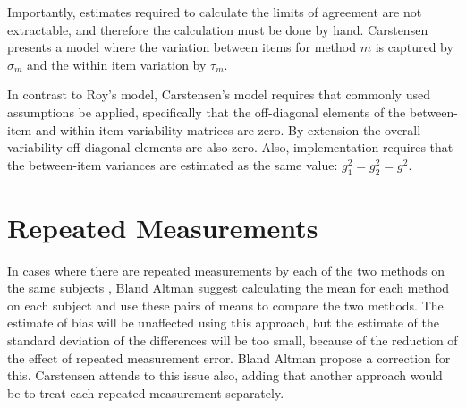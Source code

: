 \documentclass[12pt, a4paper]{report}
\theoremstyle{plain}
\theoremstyle{definition}
\theoremstyle{remark}
\begin{document}
Importantly, estimates required to calculate the limits of agreement are not extractable, and therefore the calculation must
be done by hand.
Carstensen presents a model where the variation between items for
method $m$ is captured by $\sigma_m$ and the within item variation
by $\tau_m$.



In contrast to Roy's model, Carstensen's model requires that commonly used assumptions be applied, specifically that the off-diagonal elements of the between-item and within-item variability matrices are zero. By
extension the overall variability off-diagonal elements are also zero. Also, implementation requires that the between-item variances are estimated as the same value: $g^2_1 = g^2_2 = g^2$.












\section{Repeated Measurements}

In cases where there are repeated measurements by each of the two
methods on the same subjects , Bland Altman suggest calculating
the mean for each method on each subject and use these pairs of
means to compare the two methods.
The estimate of bias will be unaffected using this approach, but
the estimate of the standard deviation of the differences will be
too small, because of the reduction of the effect of repeated
measurement error. Bland Altman propose a correction for this.
Carstensen attends to this issue also, adding that another
approach would be to treat each repeated measurement separately.
\end{document}
